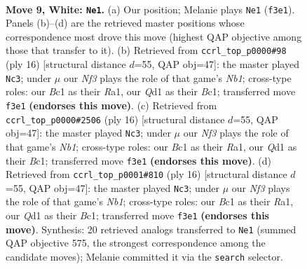 \documentclass[11pt]{article}
\begin{document}
\clearpage

\begin{figure}[p]\centering
\begin{subfigure}{0.46\textwidth}\centering
\resizebox{\linewidth}{!}{%
\newchessgame
\chessboard[
  setfen={rnbqk2r/pp3pbp/1n1pp1p1/8/3P4/1B3N2/PPP2PPP/RNBQ1RK1 w kq - 0 9},
  showmover=false,
  pgfstyle=straightmove, color=movearrow, markmove={f3-e1}
]}
\caption{}
\end{subfigure}\hfill
\begin{subfigure}{0.46\textwidth}\centering
\resizebox{\linewidth}{!}{%
\newchessgame
\chessboard[
  setfen={r1bqk2r/1p3ppp/p1n1pn2/2b5/2B5/4PN2/PP2QPPP/RNB2RK1 w kq - 2 9},
  showmover=false,
  pgfstyle=straightmove, color=movearrow, markmove={b1-c3}
]}
\caption{}
\end{subfigure}
\\[4pt]
\begin{subfigure}{0.46\textwidth}\centering
\resizebox{\linewidth}{!}{%
\newchessgame
\chessboard[
  setfen={r1bqk2r/1p3ppp/p1n1pn2/2b5/2B5/4PN2/PP2QPPP/RNB2RK1 w kq - 2 9},
  showmover=false,
  pgfstyle=straightmove, color=movearrow, markmove={b1-c3}
]}
\caption{}
\end{subfigure}\hfill
\begin{subfigure}{0.46\textwidth}\centering
\resizebox{\linewidth}{!}{%
\newchessgame
\chessboard[
  setfen={r1bqk2r/1p3ppp/p1n1pn2/2b5/2B5/4PN2/PP2QPPP/RNB2RK1 w kq - 2 9},
  showmover=false,
  pgfstyle=straightmove, color=movearrow, markmove={b1-c3}
]}
\caption{}
\end{subfigure}
\caption{\textbf{Move 9, White: \texttt{Ne1}.} (a) Our position; Melanie plays \texttt{Ne1} (\texttt{f3e1}). Panels (b)--(d) are the retrieved master positions whose correspondence most drove this move (highest QAP objective among those that transfer to it). (b) Retrieved from \texttt{ccrl\_top\_p0000\#98} (ply 16) [structural distance $d$=55, QAP obj=47]: the master played \texttt{Nc3}; under $\mu$ our \emph{Nf3} plays the role of that game's \emph{Nb1}; cross-type roles: our \emph{B}c1 as their \emph{R}a1, our \emph{Q}d1 as their \emph{B}c1; transferred move \texttt{f3e1} \textbf{(endorses this move)}. (c) Retrieved from \texttt{ccrl\_top\_p0000\#2506} (ply 16) [structural distance $d$=55, QAP obj=47]: the master played \texttt{Nc3}; under $\mu$ our \emph{Nf3} plays the role of that game's \emph{Nb1}; cross-type roles: our \emph{B}c1 as their \emph{R}a1, our \emph{Q}d1 as their \emph{B}c1; transferred move \texttt{f3e1} \textbf{(endorses this move)}. (d) Retrieved from \texttt{ccrl\_top\_p0001\#810} (ply 16) [structural distance $d$=55, QAP obj=47]: the master played \texttt{Nc3}; under $\mu$ our \emph{Nf3} plays the role of that game's \emph{Nb1}; cross-type roles: our \emph{B}c1 as their \emph{R}a1, our \emph{Q}d1 as their \emph{B}c1; transferred move \texttt{f3e1} \textbf{(endorses this move)}. Synthesis: 20 retrieved analogs transferred to \texttt{Ne1} (summed QAP objective 575, the strongest correspondence among the candidate moves); Melanie committed it via the \texttt{search} selector.}
\label{fig:thought-m16}
\end{figure}
\end{document}

